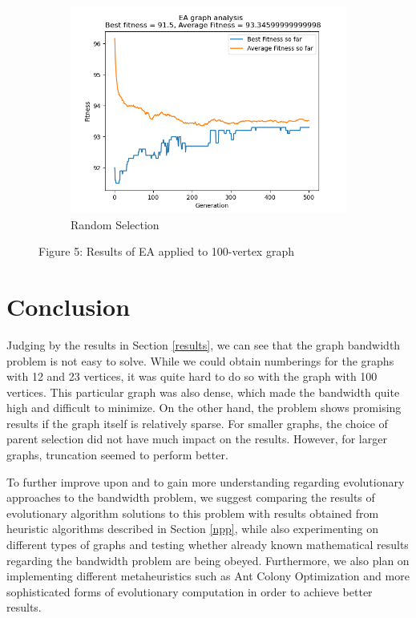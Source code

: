 \documentclass[conference,compsoc]{IEEEtran}
\begin{document}
\begin{figure}[h!]
\begin{subfigure}{0.34\textwidth}
    \includegraphics[width=\linewidth]{../Results/_100_Random_Truncation_200_100_500.png}
    \caption{Random Selection}
  \end{subfigure}
  \caption*{Figure 5: Results of EA applied to 100-vertex graph}
\end{figure}

\setlength{\parskip}{0 em}
\section{Conclusion}
Judging by the results in Section \ref{results}, we can see that the graph bandwidth problem is not easy to solve. 
While we could obtain numberings for the graphs with 12 and 23 vertices, it was quite hard to do so with the graph with 
100 vertices. This particular graph was also dense, which made the bandwidth quite high and difficult to minimize. On the 
other hand, the problem shows promising results if the graph itself is relatively sparse. For smaller graphs, the choice of 
parent selection did not have much impact on the results. However, for larger graphs, truncation seemed to perform better.

To further improve upon and to gain more understanding regarding evolutionary approaches to the bandwidth problem, 
we suggest comparing the results of evolutionary algorithm solutions to this problem with results obtained 
from heuristic algorithms described in Section \ref{npp}, while also experimenting on different 
types of graphs and testing whether already known mathematical results regarding the bandwidth problem 
are being obeyed. Furthermore, we also plan on implementing different metaheuristics
such as Ant Colony Optimization and more sophisticated forms of evolutionary computation in order to achieve better results.      
\end{document}
